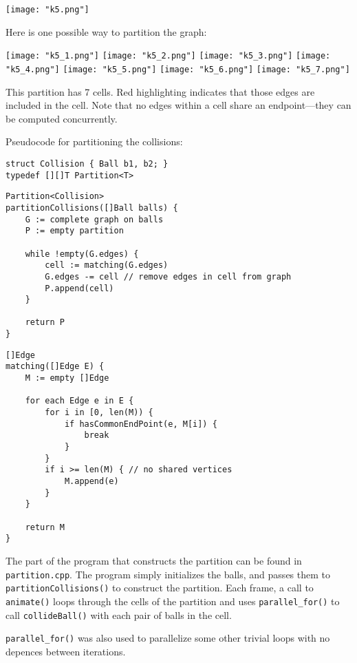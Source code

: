 \documentclass[11pt]{article}
\begin{document}
\texttt{[image: "k5.png"]}

Here is one possible way to partition the graph:

\texttt{[image: "k5\_1.png"]}
\texttt{[image: "k5\_2.png"]}
\texttt{[image: "k5\_3.png"]}
\texttt{[image: "k5\_4.png"]}
\texttt{[image: "k5\_5.png"]}
\texttt{[image: "k5\_6.png"]}
\texttt{[image: "k5\_7.png"]}

This partition has 7 cells.
Red highlighting indicates that those edges are included in the cell.
Note that no edges within a cell share an endpoint---they can be computed concurrently.

Pseudocode for partitioning the collisions:
\begin{lstlisting}
struct Collision { Ball b1, b2; }
typedef [][]T Partition<T>
\end{lstlisting}
\begin{lstlisting}
Partition<Collision>
partitionCollisions([]Ball balls) {
	G := complete graph on balls
	P := empty partition

	while !empty(G.edges) {
		cell := matching(G.edges)
		G.edges -= cell // remove edges in cell from graph
		P.append(cell)
	}

	return P
}
\end{lstlisting}
\begin{lstlisting}
[]Edge
matching([]Edge E) {
	M := empty []Edge

	for each Edge e in E {
		for i in [0, len(M)) {
			if hasCommonEndPoint(e, M[i]) {
				break
			}
		}
		if i >= len(M) { // no shared vertices
			M.append(e)
		}
	}

	return M
}
\end{lstlisting}

The part of the program that constructs the partition can be found in \texttt{partition.cpp}.
The program simply initializes the balls, and passes them to \texttt{partitionCollisions()} to construct the partition.
Each frame, a call to \texttt{animate()} loops through the cells of the partition and uses \texttt{parallel\_for()} to call \texttt{collideBall()} with each pair of balls in the cell.

\texttt{parallel\_for()} was also used to parallelize some other trivial loops with no depences between iterations.
\end{document}
